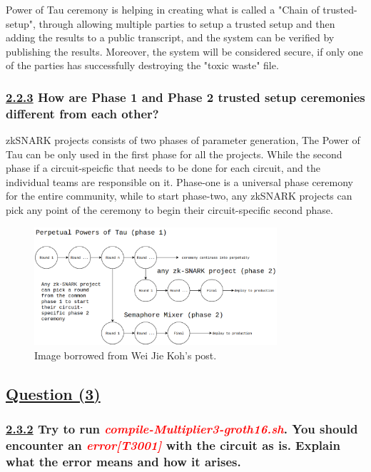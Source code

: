 \documentclass[letterpaper, 10 pt, conference]{ieeeconf}  %
\begin{document}
Power of Tau ceremony is helping in creating what is called a "Chain of trusted-setup", through allowing multiple parties to setup a trusted setup and then adding the results to a public transcript, and the system can be verified by publishing the results. Moreover, the system will be considered secure, if only one of the parties has successfully destroying the "toxic waste" file. \cite{c5}

\subsubsection{\textbf{\underline{2.2.3} How are Phase 1 and Phase 2 trusted setup ceremonies different from each other?}}

zkSNARK projects consists of two phases of parameter generation, The Power of Tau can be only used in the first phase for all the projects. While the second phase if a circuit-speicfic that needs to be done for each circuit, and the individual teams are responsible on it. 
\newline Phase-one is a universal phase ceremony for the entire community, while to start phase-two, any zkSNARK projects can pick any point of the ceremony to begin their circuit-specific second phase. \cite{c4} \cite{c6}

\begin{figure}[htp]
    \centering
    \includegraphics[width=9cm]{assets/phase1-phase2}
    \caption{Image borrowed from Wei Jie Koh’s post. \cite{c4}}
    \label{fig:galaxy}
\end{figure}

\subsection{\textbf{\underline{Question (3)}}}

\subsubsection{\textbf{\underline{2.3.2} Try to run \textcolor{red}{\textit{compile-Multiplier3-groth16.sh}}. You should encounter an \textcolor{red}{\textit{error[T3001]}} with the circuit as is. Explain what the error means and how it arises.}}
\end{document}
